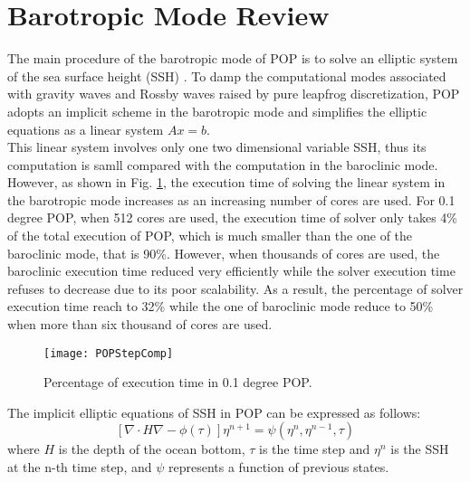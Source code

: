 \documentclass{sig-alternate}
\begin{document}
\section{Barotropic Mode Review} \label{se:baro}


The main procedure of the barotropic mode of POP is to solve an elliptic system of the sea surface height (SSH) \cite{pop05}. 
To damp the computational modes  associated with gravity waves and Rossby waves raised by pure leapfrog discretization, POP adopts an implicit scheme in the barotropic mode and simplifies the elliptic equations as a linear system $Ax=b$.\\

This linear system involves only one two dimensional variable SSH, thus its computation is samll compared with the computation in the baroclinic mode. However, as shown in Fig. \ref{fig:StepComp}, the execution time of solving the linear system in the barotropic mode increases as an increasing number of cores are used. 
For 0.1 degree POP, when 512 cores are used, the execution time of solver only takes 4\% of the total execution of POP, which is much smaller than the one of
the baroclinic mode, that is 90\%. 
However, when thousands of cores are used, the baroclinic execution time reduced very efficiently while the solver execution time refuses to decrease due to its poor scalability. 
As a result, the percentage of solver execution time reach to 32\% while the one of baroclinic mode reduce to 50\% when more than six thousand of cores are used. 

\begin {figure}
\centering
\texttt{[image: POPStepComp]}
\caption[] {Percentage of execution time in 0.1 degree POP.\label{fig:StepComp}}
\end{figure}

The implicit elliptic equations of SSH in POP can be expressed as follows:
\begin{equation}
\label{eq:ssh}
[\nabla \cdot H\nabla  -\phi(\tau)]\eta^{n+1} = \psi(\eta^n,\eta^{n-1},\tau)
\end{equation}
where $H$ is the depth of the ocean bottom, $\tau$ is the time step  and $\eta^n$ is the SSH at the n-th time step, and $\psi$ represents a function of previous states.
\end{document}

